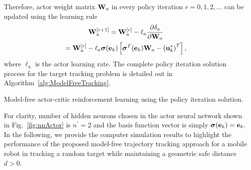 \documentclass[conference]{IEEEtran}
\begin{document}
%
Therefore, actor weight matrix ${\bf W}_a$ in every policy iteration $r = 0,1,2,\ldots$ can be updated using the learning rule %
%
\begin{multline}
  {\bf W}_a^{[r+1]} = {\bf W}_a^{[r]} - \ell_a\frac{\partial\delta_a}{\partial{\bf W}_a}\\
  = {\bf W}_a^{[r]} - \ell_a\bm{\sigma}({\bf e}_k)\left[ \bm{\sigma}^T({\bf e}_k){\bf W}_a -\left( {\bf u}_k^* \right)^T \right], 
 \label{eq:actorWeights}
\end{multline}
%
 where $\ell_a$ is the actor learning rate.  The complete policy iteration
 solution process for the target tracking problem is detailed out in Algorithm~\ref{alg:ModelFreeTracking}. 
 \begin{algorithm2e}{
     \caption{\label{alg:ModelFreeTracking} Model-free actor-critic reinforcement learning using the policy iteration solution.}
     \DontPrintSemicolon
     }
 \end{algorithm2e}    
For clarity, number of hidden neurons chosen in the actor neural network shown in Fig.~\ref{fig:nnActor} is $n^{'} = 2$ and the basis function vector is simply $\bm{\sigma}({\bf e}_k) = {\bf e}_k.$ In the following, we provide the computer simulation results to highlight the performance of the proposed model-free trajectory tracking approach for a mobile robot in tracking a random target while maintaining a geometric safe distance $d>0.$  
    
\end{document}
